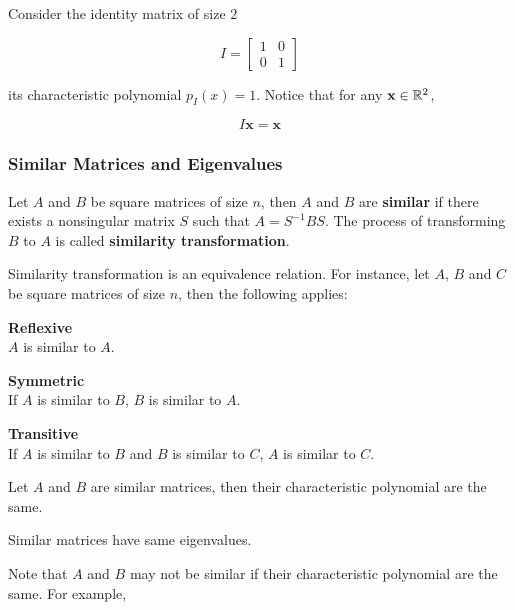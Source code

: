 \documentclass[a4paper,12pt]{article}
\begin{document}
\begin{exm}
  Consider the identity matrix of size $2$

  $$I=\begin{bmatrix}
    1 & 0\\
    0 & 1
  \end{bmatrix}$$\s

  its characteristic polynomial $p_{I}(x)=1$. Notice that for any $\mathbf{x}\in\mathbb{R}^{2}$,

  $$I\mathbf{x}=\mathbf{x}$$
\end{exm}\n

\subsubsection{Similar Matrices and Eigenvalues}
\begin{dft}
  Let $A$ and $B$ be square matrices of size $n$, then $A$ and $B$ are \textbf{similar} if there exists a nonsingular matrix $S$ such that $A=S^{-1}BS$. The process of transforming $B$ to $A$ is called \textbf{similarity transformation}.
\end{dft}\n

\begin{thm}
  Similarity transformation is an equivalence relation. For instance, let $A$, $B$ and $C$ be square matrices of size $n$, then the following applies:

  \begin{alist}
    \item \textbf{Reflexive}\\
    $A$ is similar to $A$.
    \item \textbf{Symmetric}\\
    If $A$ is similar to $B$, $B$ is similar to $A$.
    \item \textbf{Transitive}\\
    If $A$ is similar to $B$ and $B$ is similar to $C$, $A$ is similar to $C$.
  \end{alist}
\end{thm}\n

\begin{thm}
  Let $A$ and $B$ are similar matrices, then their characteristic polynomial are the same.
\end{thm}\n

\begin{crl}
  Similar matrices have same eigenvalues.
\end{crl}\n

Note that $A$ and $B$ may not be similar if their characteristic polynomial are the same. For example,
\end{document}
